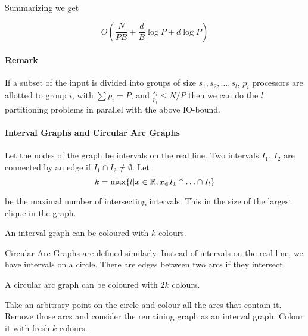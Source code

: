 Summarizing we get

\[O(\frac{N}{PB} + \frac dB \log P + d\log P)\]

\paragraph{Remark} If a subset of the input is divided into groups of size $s_1,s_2,\ldots , s_l$, $p_i$ processors are allotted to group $i$, with $\sum p_i = P$, and $\frac{s_i}{p_i}\leq N/P$ then we can do the $l$ partitioning problems in parallel with the above IO-bound.

%
%

\paragraph{Interval Graphs and Circular Arc Graphs} Let the nodes of the graph be intervals on the real line. Two intervals $I_1$, $I_2$ are connected by an edge if $I_1\cap I_2 \neq \emptyset$. Let 
\[k= \max\{l | x\in \mathbb{R}, x_\in I_1\cap \ldots \cap I_l\}\]

be the maximal number of intersecting intervals. This in the size of the largest clique in the graph. 

\begin{lem} An interval graph can be coloured with $k$ colours.\end{lem}

Circular Arc Graphs are defined similarly. Instead of intervals on the real line, we have intervals on a circle. There are edges between two arcs if they intersect.

\begin{lem} A circular arc graph can be coloured with $2k$ colours.\end{lem}

\begin{pr} Take an arbitrary point on the circle and colour all the arcs that contain it. Remove those arcs and consider the remaining graph as an interval graph. Colour it with fresh $k$ colours.\end{pr}
